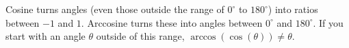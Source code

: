 \documentclass[noauthor,nooutcomes,handout,hints]{ximera}
\begin{document}
\begin{question}
\begin{freeResponse}
\begin{enumerate}
\begin{center}
      \end{center}
      Cosine turns angles (even those outside the range of $0^\circ$
      to $180^\circ$) into ratios between $-1$ and $1$. Arccosine
      turns these into angles between $0^\circ$ and $180^\circ$. If
      you start with an angle $\theta$ outside of this range, $\arccos(\cos(\theta)) \neq \theta$.
      
    \end{enumerate}
  \end{freeResponse}
\end{question}
\end{document}
